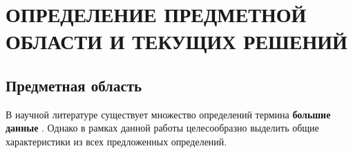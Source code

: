 \section{ОПРЕДЕЛЕНИЕ ПРЕДМЕТНОЙ ОБЛАСТИ И ТЕКУЩИХ РЕШЕНИЙ}

\subsection{Предметная область}









В научной литературе существует множество определений термина \textbf{большие данные} \cite{Bigdata_a_review, Bigdata_an_introduction, Challenges_of_big_data_analysis}. Однако в рамках данной работы целесообразно выделить общие характеристики из всех предложенных определений. 

